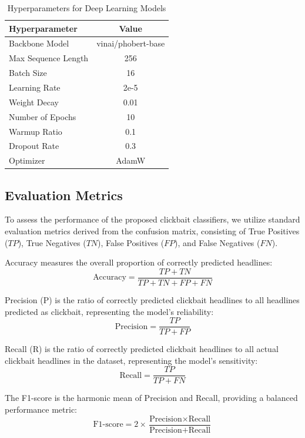 \documentclass[conference]{IEEEtran}
\begin{document}
\begin{table}[!ht]
\centering
\caption{Hyperparameters for Deep Learning Models}
\label{tab:hyperparams}
\begin{tabular}{lc}
\toprule
\textbf{Hyperparameter} & \textbf{Value} \\
\midrule
Backbone Model & vinai/phobert-base \\
Max Sequence Length & 256 \\
Batch Size & 16 \\
Learning Rate & 2e-5 \\
Weight Decay & 0.01 \\
Number of Epochs & 10 \\
Warmup Ratio & 0.1 \\
Dropout Rate & 0.3 \\
Optimizer & AdamW \\
\bottomrule
\end{tabular}
\end{table}

\subsection{Evaluation Metrics}
To assess the performance of the proposed clickbait classifiers, we utilize standard evaluation metrics derived from the confusion matrix, consisting of True Positives ($TP$), True Negatives ($TN$), False Positives ($FP$), and False Negatives ($FN$). 

Accuracy measures the overall proportion of correctly predicted headlines:
\begin{equation}
\text{Accuracy} = \frac{TP + TN}{TP + TN + FP + FN}
\end{equation}

Precision (P) is the ratio of correctly predicted clickbait headlines to all headlines predicted as clickbait, representing the model's reliability:
\begin{equation}
\text{Precision} = \frac{TP}{TP + FP}
\end{equation}

Recall (R) is the ratio of correctly predicted clickbait headlines to all actual clickbait headlines in the dataset, representing the model's sensitivity:
\begin{equation}
\text{Recall} = \frac{TP}{TP + FN}
\end{equation}

The F1-score is the harmonic mean of Precision and Recall, providing a balanced performance metric:
\begin{equation}
\text{F1-score} = 2 \times \frac{\text{Precision} \times \text{Recall}}{\text{Precision} + \text{Recall}}
\end{equation}
\end{document}

